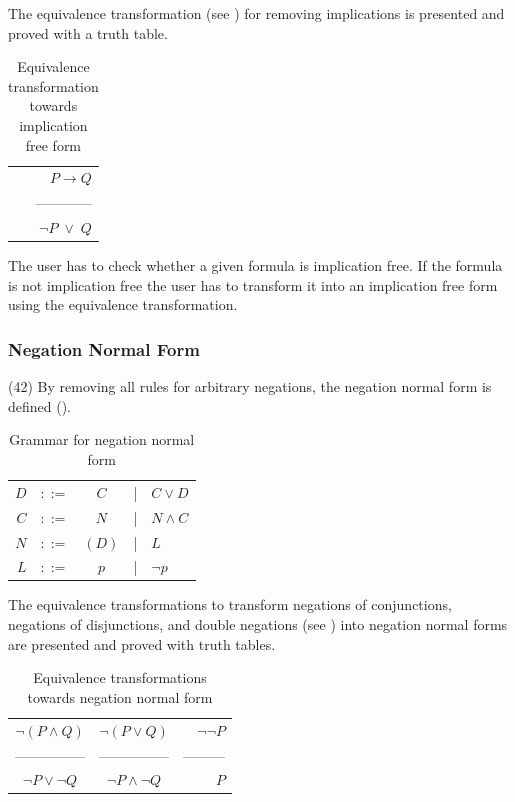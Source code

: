 The equivalence transformation (see ) 
for removing implications is presented
and proved with a truth table. 

\begin{table}[htdp]
\begin{center}
\begin{tabular}{r}
$P \rightarrow Q$ \\ 
————\\
$\neg P \;\vee\; Q$
\end{tabular}
\caption{Equivalence transformation towards implication free form}
\label{tab:ET_IFF}
\end{center}
\end{table}

The user has to check whether a given formula is implication free.
If the formula is not implication free the user has to transform it into an implication free form
using the equivalence transformation.

\subsubsection{Negation Normal Form}
\label{tut:42}

(42)
By removing all  rules for arbitrary negations, the negation normal form is defined
 (). 

\begin{table}[htdp]
\begin{center}
\begin{tabular}{rcccl}
$D$		&$::=$ & $C$ 		&|& 	$C \vee D$\\
$C$		&$::=$ & $N$ 		&|& 	$N \wedge C$ \\
$N$		&$::=$ & $(D)$ 	&|& 	$L$\\
$L$		&$::=$ & $p $ 		&|& 	$\neg p$
\end{tabular}
\caption{Grammar for negation normal form}
\label{tab:BNFGRNNF}
\end{center}
\end{table}

The equivalence transformations to transform negations of conjunctions,
negations of disjunctions, 
and double negations (see )
into negation normal forms are presented 
and proved with truth tables.

\begin{table}[htdp]
\begin{center}
\begin{tabular}{ccr}
$\neg (P \wedge Q) $&$ \neg (P \vee Q)$&$ \neg \neg P$\\
————— & —————& ———\\
$\neg P \vee \neg Q$&$\neg P \wedge \neg Q$&$P$
\end{tabular}
\caption{Equivalence transformations towards negation normal form}
\label{tab:ET_NNF}
\end{center}
\end{table}

